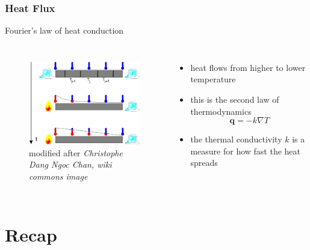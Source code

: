 \documentclass[hide notes,intlimits]{beamer}
\begin{document}
\begin{frame}
  \frametitle{Heat Flux}
 \begin{block}{Fourier's law of heat conduction}
  \begin{columns}
    \column[c]{5.5cm}
  \begin{figure}
    \includegraphics[width=5cm]{figures/heatconduction}%
   \\[.25em] \tiny{modified after \emph{Christophe Dang Ngoc Chan, wiki commons image}}
  \end{figure} 
    \column[c]{6.5cm}
  \begin{itemize}
  \item heat flows from \alert{higher} to \alert{lower} temperature
  \item this is the \alert{second law of thermodynamics}
 \begin{equation*}
    \mathbf{q} = -k \nabla T
  \end{equation*}
  \item the thermal conductivity $k$ is a measure for how fast the heat spreads
 \end{itemize}
  \end{columns}
\end{block}
\end{frame}


\section{Recap}
\end{document}
